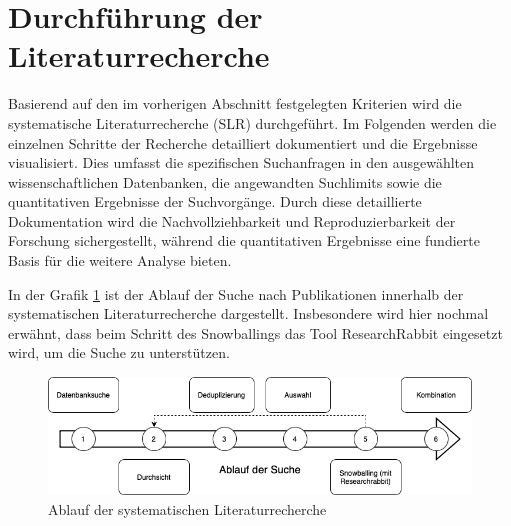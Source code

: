 \section{Durchführung der Literaturrecherche}
Basierend auf den im vorherigen Abschnitt festgelegten Kriterien wird die systematische Literaturrecherche (SLR) 
durchgeführt. Im Folgenden werden die einzelnen Schritte der Recherche detailliert dokumentiert und die Ergebnisse 
visualisiert. Dies umfasst die spezifischen Suchanfragen in den ausgewählten wissenschaftlichen Datenbanken, die 
angewandten Suchlimits sowie die quantitativen Ergebnisse der Suchvorgänge. Durch diese detaillierte Dokumentation 
wird die Nachvollziehbarkeit und Reproduzierbarkeit der Forschung sichergestellt, während die quantitativen 
Ergebnisse eine fundierte Basis für die weitere Analyse bieten.

In der Grafik \ref{fig:search_process} ist der Ablauf der Suche nach Publikationen innerhalb der 
systematischen Literaturrecherche dargestellt. Insbesondere wird hier nochmal erwähnt, dass beim Schritt des 
Snowballings das Tool ResearchRabbit eingesetzt wird, um die Suche zu unterstützen. 

\begin{figure}[h!]
    \centering
    \includegraphics[width=1\textwidth]{graphics/ablauf_der_suche.png}
    \caption{Ablauf der systematischen Literaturrecherche}
    \label{fig:search_process}
\end{figure}


